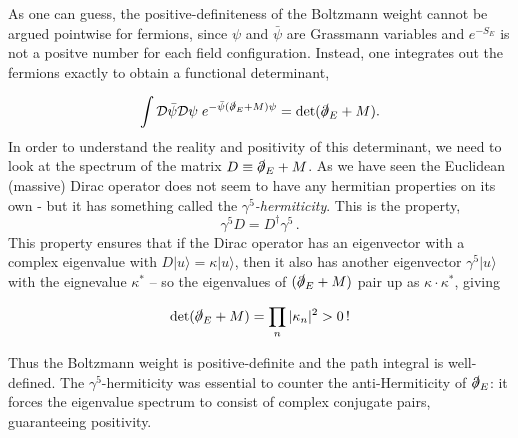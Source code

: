 \documentclass[11pt]{article}
\theoremstyle{definition}
\begin{document}
As one can guess, the positive-definiteness of the Boltzmann weight cannot be argued pointwise for 
fermions, since $\psi$ and $\bar{\psi}$ are Grassmann variables and $e^{-S_E}$ 
is not a positve number for each field configuration. Instead, one integrates out 
the fermions exactly to obtain a functional determinant,

\begin{equation}
    \int \mathcal{D}\bar{\psi}\mathcal{D}\psi\; 
    e^{-\bar{\psi}(\slashed{\partial}_E + M)\psi} = \det(\slashed{\partial}_E + M).
\end{equation}
In order to understand the reality and positivity of this determinant, we need to look at the spectrum of the matrix $D\equiv \slashed{\partial}_E + M$. As we have seen the Euclidean (massive) Dirac operator does not seem to have any hermitian properties on its own - but it has something called the \textit{$\gamma^5$-hermiticity}. This is the property,
\begin{equation}
    \gamma^5 D = D^{\dagger}\gamma^5 \,.
\end{equation}
\noindent This property ensures that if the Dirac operator has an eigenvector with a complex eigenvalue with $D |u\rangle = \kappa |u\rangle$, then it also has another eigenvector $\gamma^5 |u\rangle$ with the eignevalue $\kappa^*$ -- so the eigenvalues of $(\slashed{\partial}_E + M)$ pair up as $\kappa \cdot \kappa^*$, giving

\begin{equation}
    \det(\slashed{\partial}_E + M) = \prod_n |\kappa_n|^2 > 0 \,!
\end{equation}

\noindent Thus the Boltzmann weight is positive-definite and the path integral is 
well-defined. The $\gamma^5$-hermiticity was essential to counter the anti-Hermiticity of $\slashed{\partial}_E$: it forces the eigenvalue spectrum to consist of complex conjugate pairs, guaranteeing positivity.
\end{document}
